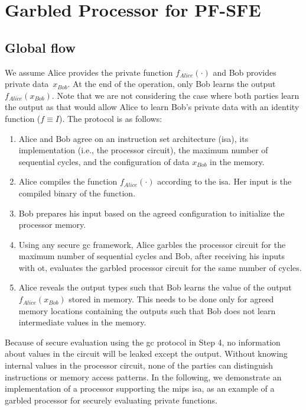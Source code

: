 \section{Garbled Processor for PF-SFE} \label{sec:processor-pro-pfsfe}
\subsection{Global flow}\label{ssec:processor-mips-flow}
We assume Alice provides the private function $f_{Alice}(\cdot)$ and Bob provides private data~$x_{Bob}$.
At the end of the operation, only Bob learns the output $f_{Alice}(x_{Bob})$.
Note that we are not considering the case where both parties learn the output as that would allow Alice to learn Bob's private data with an identity function ($f\equiv I$).
The protocol is as follows:

\begin{enumerate}
\item
  Alice and Bob agree on an instruction set architecture (\acrshort{isa}), its implementation (i.e., the processor circuit), the maximum number of sequential cycles, and the configuration of data $x_{Bob}$ in the memory.
\item
  Alice compiles the function $f_{Alice}(\cdot)$ according to the \acrshort{isa}.
  Her input is the compiled binary of the function.
\item
  Bob prepares his input based on the agreed configuration to initialize the processor memory.
\item
  Using any secure \acrshort{gc} framework, Alice garbles the processor circuit for the maximum number of sequential cycles and Bob, after receiving his inputs with \acrshort{ot}, evaluates the garbled processor circuit for the same number of cycles.

\item
  Alice reveals the output types such that Bob learns the value of the output $f_{Alice}(x_{Bob})$ stored in memory.
  This needs to be done only for agreed memory locations containing the outputs such that Bob does not learn intermediate values in the memory.
\end{enumerate}

Because of secure evaluation using the \acrshort{gc} protocol in Step 4, no information about values in the circuit will be leaked except the output.
Without knowing internal values in the processor circuit, none of the parties can distinguish instructions or memory access patterns.
In the following, we demonstrate an implementation of a processor supporting the \gls{mips} \acrshort{isa}, as an example of a garbled processor for securely evaluating private functions.

